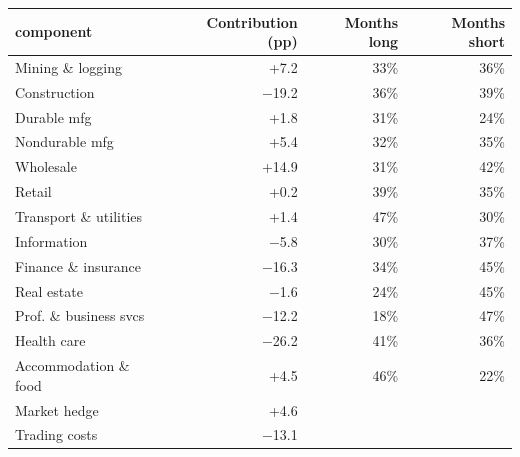 \begin{tabular}{lrrr}
\toprule
component & Contribution (pp) & Months long & Months short \\
\midrule
Mining \& logging & +7.2 & 33\% & 36\% \\
Construction & $-$19.2 & 36\% & 39\% \\
Durable mfg & +1.8 & 31\% & 24\% \\
Nondurable mfg & +5.4 & 32\% & 35\% \\
Wholesale & +14.9 & 31\% & 42\% \\
Retail & +0.2 & 39\% & 35\% \\
Transport \& utilities & +1.4 & 47\% & 30\% \\
Information & $-$5.8 & 30\% & 37\% \\
Finance \& insurance & $-$16.3 & 34\% & 45\% \\
Real estate & $-$1.6 & 24\% & 45\% \\
Prof. \& business svcs & $-$12.2 & 18\% & 47\% \\
Health care & $-$26.2 & 41\% & 36\% \\
Accommodation \& food & +4.5 & 46\% & 22\% \\
Market hedge & +4.6 &  &  \\
Trading costs & $-$13.1 &  &  \\
\bottomrule
\end{tabular}
